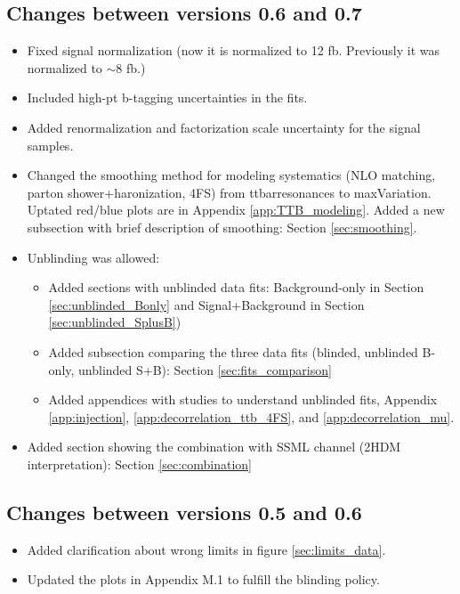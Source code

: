 \subsection{Changes between versions 0.6 and 0.7}

\begin{itemize}
  \item Fixed signal normalization (now it is normalized to 12 fb. Previously it was normalized to ${\sim}8$ fb.)
  \item Included high-pt b-tagging uncertainties in the fits.
  \item Added renormalization and factorization scale uncertainty for the signal samples.
  \item Changed the smoothing method for \ttbin modeling systematics (NLO matching, parton shower+haronization, 4FS) from ttbarresonances to maxVariation. Uptated red/blue plots are in Appendix \ref{app:TTB_modeling}. Added a new subsection with brief description of smoothing: Section \ref{sec:smoothing}.
  \item Unblinding was allowed:
  \begin{itemize}
    \item Added sections with unblinded data fits: Background-only in Section \ref{sec:unblinded_Bonly} and Signal+Background in Section \ref{sec:unblinded_SplusB})
    \item Added subsection comparing the three data fits (blinded, unblinded B-only, unblinded S+B): Section \ref{sec:fits_comparison}
    \item Added appendices with studies to understand unblinded fits, Appendix \ref{app:injection}, \ref{app:decorrelation_ttb_4FS}, and \ref{app:decorrelation_mu}.
  \end{itemize}
  \item Added section showing the combination with SSML channel (2HDM interpretation): Section \ref{sec:combination}
\end{itemize}


\subsection{Changes between versions 0.5 and 0.6}

\begin{itemize}
  \item Added clarification about wrong limits in figure \ref{sec:limits_data}.
  \item Updated the plots in Appendix M.1 to fulfill the blinding policy.
\end{itemize}



